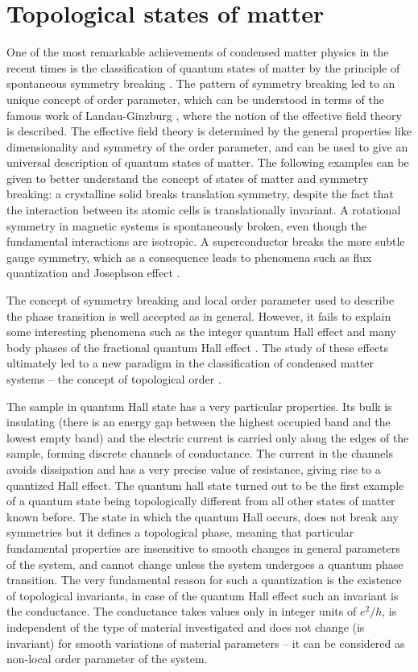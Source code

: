\documentclass[titlepage,a4paper]{book}
\newcommand{\wciecie}{\quad\phantom{v}}
\begin{document}
\section{Topological states of matter}
\wciecie
One of the most remarkable achievements of condensed matter physics in the recent times is the classification of quantum states of matter by the principle of spontaneous symmetry breaking \cite{Anderson_Topology}. The pattern of symmetry breaking led to an unique concept of order parameter, which can be understood in terms of the famous work of Landau-Ginzburg \cite{Landau_Topology}, where the notion of the effective field theory is described. The effective field theory is determined by the general properties like dimensionality and symmetry of the order parameter, and can be used to give an universal description of quantum states of matter. The following examples can be given to better understand the concept of states of matter and symmetry breaking: a crystalline solid breaks translation symmetry, despite the fact that the interaction between its atomic cells is translationally invariant. A rotational symmetry in magnetic systems is spontaneously broken, even though the fundamental interactions are isotropic. A superconductor breaks the more subtle gauge symmetry, which as a consequence leads to phenomena such as flux quantization and Josephson effect \cite{Josephson_Topology}.

The concept of symmetry breaking and local order parameter used to describe the phase transition is well accepted as in general. However, it fails to explain some interesting phenomena such as the integer quantum Hall effect \cite{Klitzing_Topology} and many body phases of the fractional quantum Hall effect \cite{Tsui_Topology}. The study of these effects ultimately led to a new paradigm in the classification of condensed matter systems -- the concept of topological order \cite{Laughlin_Topology} \cite{Thouless_Topology}.

The sample in quantum Hall state has a very particular properties. Its bulk is insulating (there is an energy gap between the highest occupied band and the lowest empty band) and the electric current is carried only along the edges of the sample, forming discrete channels of conductance. The current in the channels avoids dissipation and has a very precise value of resistance, giving rise to a quantized Hall effect. The quantum hall state turned out to be the first example of a quantum state being topologically different from all other states of matter known before. The state in which the quantum Hall occurs, does not break any symmetries but it defines a topological phase, meaning that particular fundamental properties are insensitive to smooth changes in general parameters of the system, and cannot change unless the system undergoes a quantum phase transition. The very fundamental reason for such a quantization is the existence of topological invariants, in case of the quantum Hall effect such an invariant is the conductance. The conductance takes values only in integer units of $e^2/h$, is independent of the type of material investigated and does not change (is invariant) for smooth variations of material parameters – it can be considered as non-local order parameter of the system.  
\end{document}
